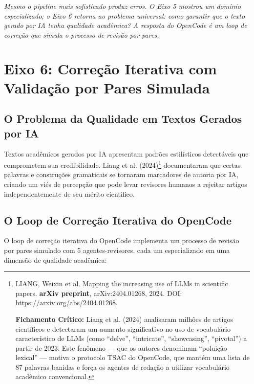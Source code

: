 {\small\itshape Mesmo o pipeline mais sofisticado produz erros. O Eixo 5 mostrou um domínio especializado; o Eixo 6 retorna ao problema universal: como garantir que o texto gerado por IA tenha qualidade acadêmica? A resposta do OpenCode é um loop de correção que simula o processo de revisão por pares.}

\section{Eixo 6: Correção Iterativa com Validação por Pares Simulada}

\subsection{O Problema da Qualidade em Textos Gerados por IA}

Textos acadêmicos gerados por IA apresentam padrões estilísticos detectáveis que comprometem sua credibilidade. Liang et al. (2024)\footnote{
  LIANG, Weixin et al. Mapping the increasing use of LLMs in scientific papers. \textbf{arXiv preprint}, arXiv:2404.01268, 2024. DOI: \url{https://arxiv.org/abs/2404.01268}.

  \textbf{Fichamento Crítico:} Liang et al. (2024) analisaram milhões de artigos científicos e detectaram um aumento significativo no uso de vocabulário característico de LLMs (como ``delve'', ``intricate'', ``showcasing'', ``pivotal'') a partir de 2023. Este fenômeno --- que os autores denominam ``poluição lexical'' --- motiva o protocolo TSAC do OpenCode, que mantém uma lista de 87 palavras banidas e força os agentes de redação a utilizar vocabulário acadêmico convencional.
} documentaram que certas palavras e construções gramaticais se tornaram marcadores de autoria por IA, criando um viés de percepção que pode levar revisores humanos a rejeitar artigos independentemente de seu mérito científico.

\subsection{O Loop de Correção Iterativa do OpenCode}

O loop de correção iterativa do OpenCode implementa um processo de revisão por pares simulado com 5 agentes-revisores, cada um especializado em uma dimensão de qualidade acadêmica:

